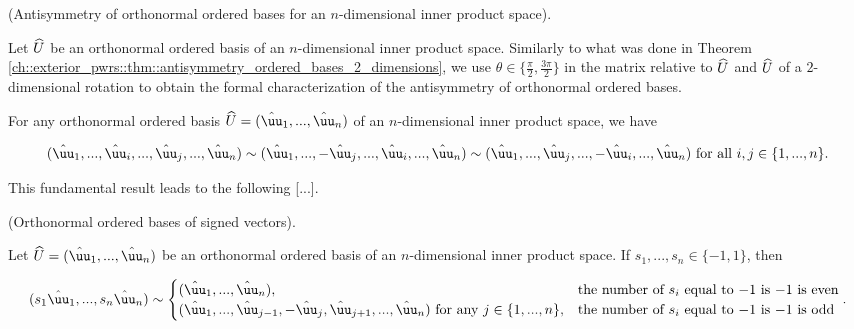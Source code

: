 \begin{theorem}
    \label{ch::exterior_pwrs::thm::antisymmetry_ordered_bases_general}

    (Antisymmetry of orthonormal ordered bases for an $n$-dimensional inner product space).

    Let $\widehat{U}$ be an orthonormal ordered basis of an $n$-dimensional inner product space. Similarly to what was done in Theorem \ref{ch::exterior_pwrs::thm::antisymmetry_ordered_bases_2_dimensions}, we use $\theta \in \{\frac{\pi}{2}, \frac{3\pi}{2}\}$ in the matrix relative to $\widehat{U}$ and $\widehat{U}$ of a $2$-dimensional rotation to obtain the formal characterization of the antisymmetry of orthonormal ordered bases.
    
    For any orthonormal ordered basis $\hU = (\huu_1, ..., \huu_n)$ of an $n$-dimensional inner product space, we have
    
    \begin{align*}
        (\huu_1, ..., \huu_i, ..., \huu_j, ..., \huu_n)
        \sim
        (\huu_1, ..., -\huu_j, ..., \huu_i, ..., \huu_n)
        \sim
        (\huu_1, ..., \huu_j, ..., -\huu_i, ..., \huu_n) \text{ for all $i, j \in \{1, ..., n\}$}.
    \end{align*}
\end{theorem}

This fundamental result leads to the following [...].

\begin{theorem}
    \label{ch::exterior_pwrs::thm::antisymmetry_ordered_bases_signs}

    (Orthonormal ordered bases of signed vectors).
    
    Let $\hU = (\huu_1, ..., \huu_n)$ be an orthonormal ordered basis of an $n$-dimensional inner product space. If $s_1, ..., s_n \in \{-1, 1\}$, then

    \begin{align*}
        (s_1 \huu_1, ..., s_n \huu_n) \sim
        \begin{cases}
            (\huu_1, ..., \huu_n), & \text{the number of $s_i$ equal to $-1$ is $-1$ is even} \\
            (\huu_1, ..., \huu_{j - 1}, -\huu_j, \huu_{j + 1}, ..., \huu_n) \text{ for any $j \in \{1, ..., n\}$}, & \text{the number of $s_i$ equal to $-1$ is $-1$ is odd} 
        \end{cases}.
    \end{align*}
\end{theorem}

